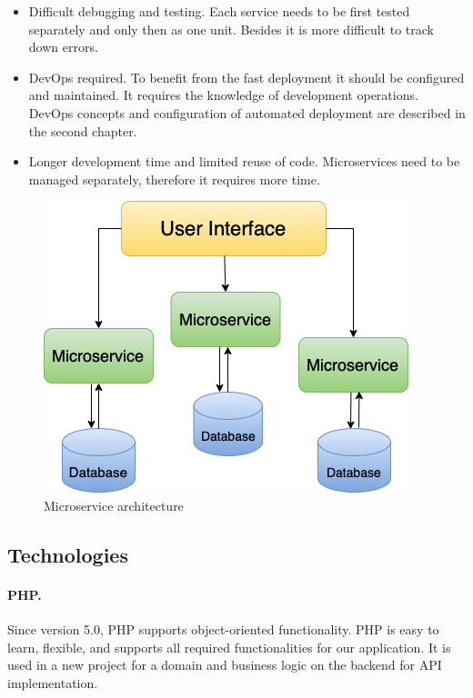 \begin{itemize}
  \item Difficult debugging and testing. Each service needs to be first tested separately and only then as one unit. Besides it is more difficult to track down errors.
  
  \item DevOps required. To benefit from the fast deployment it should be configured and maintained. It requires the knowledge of development operations. DevOps concepts and configuration of automated deployment are described in the second chapter.

  \item Longer development time and limited reuse of code. Microservices need to be managed separately, therefore it requires more time.
\end{itemize}



\begin{figure}[hp]
\centering
\includegraphics[scale=0.67]{../png/microservices.png}
\caption{Microservice architecture}\label{picture:mvp}
\end{figure}



\subsection{Technologies}

\paragraph*{PHP.} Since version 5.0, PHP supports object-oriented functionality. PHP is easy to learn, flexible, and supports all required functionalities for our application. It is used in a new project for a domain and business logic on the backend for API implementation.

